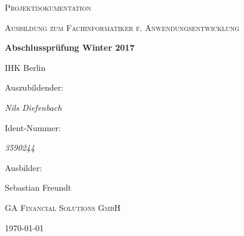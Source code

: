 \documentclass[fontsize=11pt,paper=a4,draft=off,titlepage=off, twoside]{scrartcl}
\begin{document}
\pagestyle{fancy}


\begin{titlepage}
    \centering
    {\scshape\LARGE Projektdokumentation\par}
    \vspace{1cm}
    {\scshape\Large Ausbildung zum Fachinformatiker f. Anwendungsentwicklung\par}
    \vspace{1.5cm}
    {\huge\bfseries Abschlussprüfung Winter 2017\par IHK Berlin\par}
    \vspace{2cm}
    Auszubildender:\par
    {\Large\itshape Nils Diefenbach\par}
    Ident-Nummer:\par
    {\Large\itshape 3590244\par}
    \vfill
    Ausbilder:\par
    Sebastian Freundt\par \textsc{GA Financial Solutions GmbH}
    \vfill
    {\large \today\par}
\end{titlepage}
\clearpage

\tableofcontents{}
\clearpage

\thispagestyle{empty}
\listoffigures
\listoftables
\newpage
{}

\label{section:abbreviations}

\clearpage

\label{section:einleitung}

\clearpage


























\end{document}

